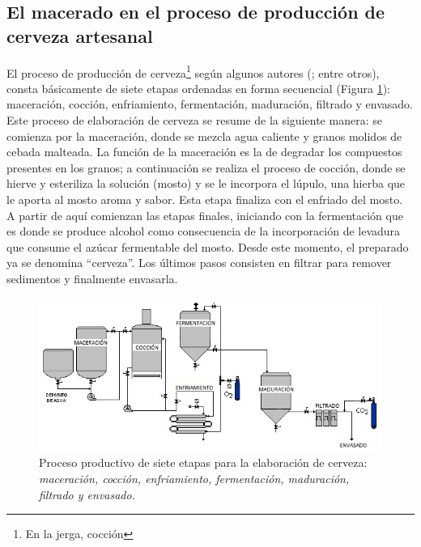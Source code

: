     \subsection{El macerado en el proceso de producción de cerveza artesanal}
    \par
    El proceso de producción de cerveza\footnote{En la jerga, cocción} según algunos autores (\cite{Dummies08,DogBrewery,AmericanHomeBrewers18, Novozymes13}; entre otros), consta básicamente de siete etapas ordenadas en forma secuencial (Figura \ref{ProcFab}): maceración, cocción, enfriamiento, fermentación, maduración, filtrado y envasado. Este proceso de elaboración de cerveza se resume de la siguiente manera: se comienza por la maceración, donde se mezcla agua caliente y granos molidos de cebada malteada. La función de la maceración es la de degradar los compuestos presentes en los granos; a continuación se realiza el proceso de cocción, donde se hierve y esteriliza la solución (mosto) y se le incorpora el lúpulo, una hierba que le aporta al mosto aroma y sabor. Esta etapa finaliza con el enfriado del mosto. A partir de aquí comienzan las etapas finales, iniciando con la fermentación que es donde se produce alcohol como consecuencia de la incorporación de levadura que consume el azúcar fermentable del mosto. Desde este momento, el preparado ya se denomina ``cerveza''. Los últimos pasos consisten en filtrar para remover sedimentos y finalmente envasarla.
 
    \begin{figure}[h]
		\centerline{\includegraphics[scale=0.75]{introduccion/Etapasdelproceso.jpg}}
		\caption{Proceso productivo de siete etapas para la elaboración de cerveza: \textit{maceración, cocción, enfriamiento, fermentación, maduración, filtrado y envasado.}}
	    \label{ProcFab}
	\end{figure}
	
